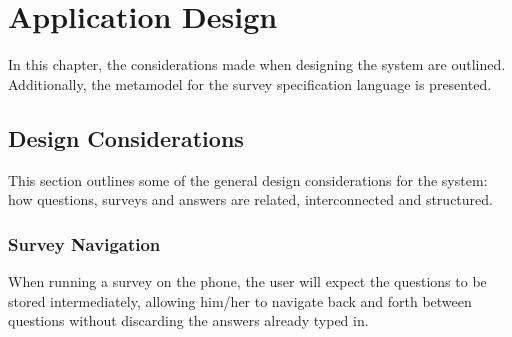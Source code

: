 \chapter{Application Design}
\label{chap:design}
In this chapter, the considerations made when designing the system are outlined. Additionally, the metamodel for the survey specification language is presented.

\section{Design Considerations}
\label{sec:designconsiderations}
This section outlines some of the general design considerations for the system: how questions, surveys and answers are related, interconnected and structured.

\subsection{Survey Navigation}
\label{subsec:surveynavigation}
When running a survey on the phone, the user will expect the questions to be stored intermediately, allowing him/her to navigate back and forth between questions without discarding the answers already typed in.
